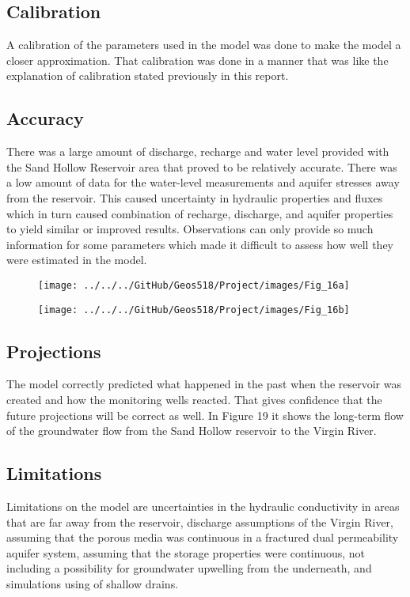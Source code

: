 \documentclass[]{report}
\begin{document}
\subsection{Calibration}
A calibration of the parameters used in the model was done to make the model a closer approximation. That calibration was done in a manner that was like the explanation of calibration stated previously in this report.
\subsection{Accuracy}
There was a large amount of discharge, recharge and water level provided with the Sand Hollow Reservoir area that proved to be relatively accurate. There was a low amount of data for the water-level measurements and aquifer stresses away from the reservoir. This caused uncertainty in hydraulic properties and fluxes which in turn caused combination of recharge, discharge, and aquifer properties to yield similar or improved results. Observations can only provide so much information for some parameters which made it difficult to assess how well they were estimated in the model.
\begin{figure}[h]
	\centering
	\begin{minipage}{0.4\textwidth}
		\texttt{[image: ../../../GitHub/Geos518/Project/images/Fig\_16a]}
	\end{minipage}
	\hfill
	\begin{minipage}{0.4\textwidth}
		\texttt{[image: ../../../GitHub/Geos518/Project/images/Fig\_16b]}
	\end{minipage}
\end{figure} 
\subsection{Projections}
The model correctly predicted what happened in the past when the reservoir was created and how the monitoring wells reacted. That gives confidence that the future projections will be correct as well. In Figure 19 it shows the long-term flow of the groundwater flow from the Sand Hollow reservoir to the Virgin River.
\subsection{Limitations}
Limitations on the model are uncertainties in the hydraulic conductivity in areas that are far away from the reservoir, discharge assumptions of the Virgin River, assuming that the porous media was continuous in a fractured dual permeability aquifer system, assuming that the storage properties were continuous, not including a possibility for groundwater upwelling from the underneath, and simulations using of shallow drains.
\end{document}
